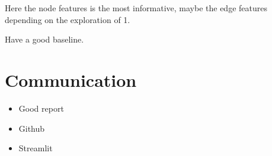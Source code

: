 \documentclass[a4paper,10pt]{article}
\begin{document}
Here the node features is the most informative, maybe the edge features depending on the exploration of 1.


Have a good baseline.





\section{Communication}


\begin{itemize}
  \item Good report
  \item Github
  \item Streamlit
\end{itemize}



\end{document}
